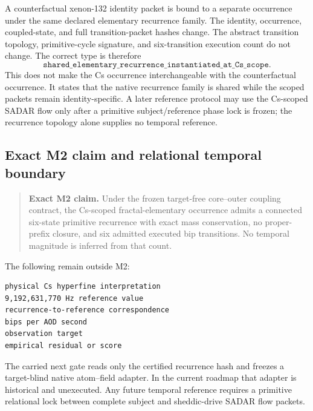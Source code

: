 A counterfactual xenon-132 identity packet is bound to a separate occurrence
under the same declared elementary recurrence family.  The identity,
occurrence, coupled-state, and full transition-packet hashes change.  The
abstract transition topology, primitive-cycle signature, and six-transition
execution count do not change.  The correct type is therefore
\[
\boxed{
\texttt{shared\_elementary\_recurrence\_instantiated\_at\_Cs\_scope}.
}
\]
This does not make the Cs occurrence interchangeable with the counterfactual
occurrence.  It states that the native recurrence family is shared while the
scoped packets remain identity-specific.  A later reference protocol may use
the Cs-scoped SADAR flow only after a primitive subject/reference phase lock is
frozen; the recurrence topology alone supplies no temporal reference.

\subsection{Exact M2 claim and relational temporal boundary}

\begin{quote}
\textbf{Exact M2 claim.}
Under the frozen target-free core--outer coupling contract, the Cs-scoped
fractal-elementary occurrence admits a connected six-state primitive recurrence
with exact mass conservation, no proper-prefix closure, and six admitted
executed bip transitions.  No temporal magnitude is inferred from that count.
\end{quote}

The following remain outside M2:
\begin{verbatim}
physical Cs hyperfine interpretation
9,192,631,770 Hz reference value
recurrence-to-reference correspondence
bips per AOD second
observation target
empirical residual or score
\end{verbatim}
The carried next gate reads only the certified recurrence hash and freezes a
target-blind native atom--field adapter.  In the current roadmap that adapter
is historical and unexecuted.  Any future temporal reference requires a
primitive relational lock between complete subject and sheddic-drive SADAR
flow packets.

